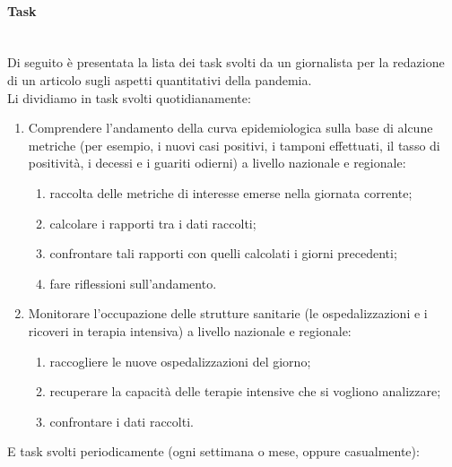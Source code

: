 \paragraph{Task}\mbox{}\\
Di seguito è presentata la lista dei task svolti da un giornalista per la redazione di un articolo sugli aspetti quantitativi della pandemia.\\
Li dividiamo in task svolti quotidianamente:
\begin{enumerate}
    \item Comprendere l'andamento della curva epidemiologica sulla base di alcune metriche (per esempio, i nuovi casi positivi, i tamponi effettuati, il tasso di positività, i decessi e i guariti odierni) a livello nazionale e regionale:
    \begin{enumerate}[label=\alph*]
        \item raccolta delle metriche di interesse emerse nella giornata corrente;
        \item calcolare i rapporti tra i dati raccolti;
        \item confrontare tali rapporti con quelli calcolati i giorni precedenti;
        \item fare riflessioni sull'andamento.
    \end{enumerate}
    \item Monitorare l'occupazione delle strutture sanitarie (le ospedalizzazioni e i ricoveri in terapia intensiva) a livello nazionale e regionale:
    \begin{enumerate}[label=\alph*]
        \item raccogliere le nuove ospedalizzazioni del giorno;
        \item recuperare la capacità delle terapie intensive che si vogliono analizzare;
        \item confrontare i dati raccolti.
    \end{enumerate}
\end{enumerate}
E task svolti periodicamente (ogni settimana o mese, oppure casualmente):
